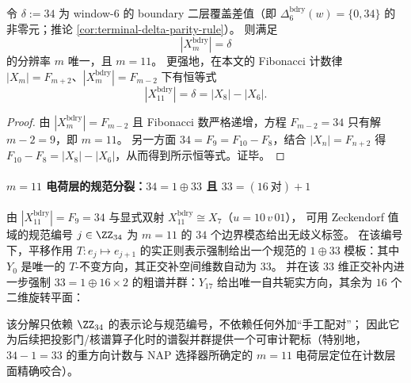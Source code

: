 \begin{theorem}[\texorpdfstring{$\delta=34$}{δ=34} 的边界共振与 \texorpdfstring{$m=11$}{m=11} 的唯一性]\label{thm:bdry-delta34-m11-uniqueness}
令 \(\delta:=34\) 为 window-\(6\) 的 boundary 二层覆盖差值（即 \(\Delta^{\mathrm{bdry}}_6(w)=\{0,34\}\) 的非零元；推论 \ref{cor:terminal-delta-parity-rule}）。
则满足
\[
|X^{\mathrm{bdry}}_m|=\delta
\]
的分辨率 \(m\) 唯一，且 \(m=11\)。
更强地，在本文的 Fibonacci 计数律 \(|X_m|=F_{m+2}\)、\(|X^{\mathrm{bdry}}_m|=F_{m-2}\) 下有恒等式
\[
|X^{\mathrm{bdry}}_{11}|=\delta=|X_8|-|X_6|.
\]
\end{theorem}
\begin{proof}
由 \(|X^{\mathrm{bdry}}_m|=F_{m-2}\) 且 Fibonacci 数严格递增，方程 \(F_{m-2}=34\) 只有解 \(m-2=9\)，即 \(m=11\)。
另一方面 \(34=F_9=F_{10}-F_8\)，结合 \(|X_n|=F_{n+2}\) 得
\(
F_{10}-F_8=|X_8|-|X_6|
\)，从而得到所示恒等式。证毕。
\end{proof}

\paragraph{\texorpdfstring{$m=11$}{m=11} 电荷层的规范分裂：\texorpdfstring{$34=1\oplus 33$}{34=1+33} 且 \texorpdfstring{$33=(16\ \text{对})+1$}{33=(16 pairs)+1}}
由 \(|X_{11}^{\mathrm{bdry}}|=F_9=34\) 与显式双射 \(X_{11}^{\mathrm{bdry}}\cong X_7\)（\(u=10\,v\,01\)），
可用 Zeckendorf 值域的规范编号 \(j\in\ZZ_{34}\) 为 \(m=11\) 的 \(34\) 个边界模态给出无歧义标签。
在该编号下，平移作用 \(T:e_j\mapsto e_{j+1}\) 的实正则表示强制给出一个规范的 \(1\oplus 33\) 模板：其中 \(Y_0\) 是唯一的 \(T\)-不变方向，其正交补空间维数自动为 \(33\)。
并在该 \(33\) 维正交补内进一步强制 \(33=1\oplus 16\times 2\) 的粗谱并群：\(Y_{17}\) 给出唯一自共轭实方向，其余为 \(16\) 个二维旋转平面：

该分解只依赖 \(\ZZ_{34}\) 的表示论与规范编号，不依赖任何外加“手工配对”；
因此它为后续把投影门/核谱算子化时的谱裂并群提供一个可审计靶标（特别地，\(34-1=33\) 的重方向计数与 NAP 选择器所确定的 \(m=11\) 电荷层定位在计数层面精确咬合）。
